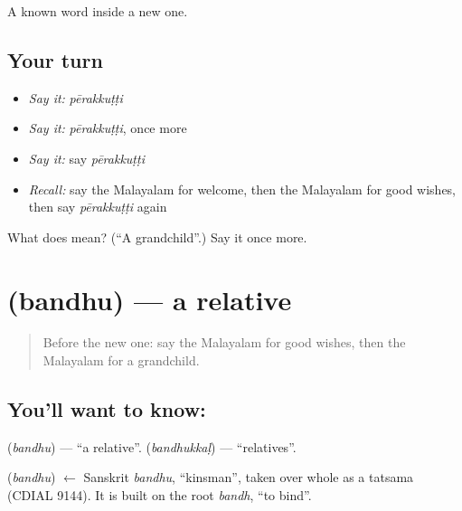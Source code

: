 \begin{grammarlens}[title={What you've built}]
A known word inside a new one.
\end{grammarlens}

\subsection*{Your turn}
\begin{itemize}
\raggedright
  \item \emph{Say it:} \emph{pērakkuṭṭi}
  \item \emph{Say it:} \emph{pērakkuṭṭi}, once more
  \item \emph{Say it:} say \emph{pērakkuṭṭi}
  \item \emph{Recall:} say the Malayalam for welcome, then the Malayalam for good wishes, then say \emph{pērakkuṭṭi} again
\end{itemize}

\begin{tcolorbox}[breakable,colback=teal!4,colframe=teal!35!black,title={Before you move on}]
What does  mean? (\textquotedblleft{}A grandchild\textquotedblright{}.) Say it once more.
\end{tcolorbox}
\section[\texorpdfstring{\ml{ബന്ധു} (bandhu)}{ബന്ധു (bandhu)}]{ (bandhu) — a relative}

\label{lesson:ML-C125-relative}



\begin{quote}
Before the new one: say the Malayalam for good wishes, then the Malayalam for a grandchild.
\end{quote}

\subsection*{You'll want to know: }
\textbf{} (\emph{bandhu}) — \textquotedblleft{}a relative\textquotedblright{}. \textbf{} (\emph{bandhukkaḷ}) — \textquotedblleft{}relatives\textquotedblright{}.

\begin{cousinweb}
\textbf{} (\emph{bandhu}) $\leftarrow$ Sanskrit \emph{bandhu}, \textquotedblleft{}kinsman\textquotedblright{}, taken over whole as a tatsama (CDIAL 9144). It is built on the root \emph{bandh}, \textquotedblleft{}to bind\textquotedblright{}.
\end{cousinweb}

